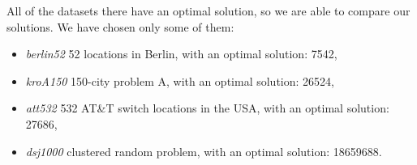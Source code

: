 	All of the datasets there have an optimal solution, so we are able to compare our solutions. We have chosen only some of them:
	\begin{itemize}
		\item \textit{berlin52} 52 locations in Berlin, with an optimal solution: 7542,
		\item \textit{kroA150} 150-city problem A, with an optimal solution: 26524,
		\item \textit{att532} 532 AT\&T switch locations in the USA, with an optimal solution: 27686,
		\item \textit{dsj1000} clustered random problem, with an optimal solution: 18659688.
	\end{itemize}